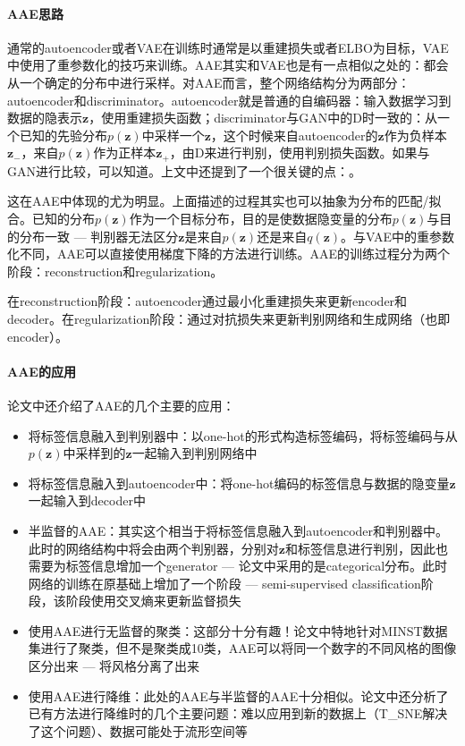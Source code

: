 \paragraph{AAE思路}
通常的autoencoder或者VAE\cite{kingma2014autoencoding}在训练时通常是以重建损失或者ELBO为目标，VAE中使用了重参数化的技巧来训练。AAE其实和VAE也是有一点相似之处的：都会从一个确定的分布中进行采样。对AAE而言，整个网络结构分为两部分：autoencoder和discriminator。autoencoder就是普通的自编码器：输入数据学习到数据的隐表示$\boldsymbol{z}$，使用重建损失函数；discriminator与GAN中的D时一致的：从一个已知的先验分布$p(\boldsymbol{z})$中采样一个$\boldsymbol{z}$，这个时候来自autoencoder的$\boldsymbol{z}$作为负样本$\boldsymbol{z}_-$，来自$p(\boldsymbol{z})$作为正样本$\boldsymbol{z}_+$，由D来进行判别，使用判别损失函数。如果与GAN进行比较，可以知道。上文中还提到了一个很关键的点：。

这在AAE中体现的尤为明显。上面描述的过程其实也可以抽象为分布的匹配/拟合。已知的分布$p(\boldsymbol{z})$作为一个目标分布，目的是使数据隐变量的分布$p(\boldsymbol{z})$与目的分布一致 --- 判别器无法区分$\boldsymbol{z}$是来自$p(\boldsymbol{z})$还是来自$q(\boldsymbol{z})$。与VAE中的重参数化不同，AAE可以直接使用梯度下降的方法进行训练。AAE的训练过程分为两个阶段：reconstruction和regularization。

在reconstruction阶段：autoencoder通过最小化重建损失来更新encoder和decoder。在regularization阶段：通过对抗损失来更新判别网络和生成网络（也即encoder）。



\paragraph{AAE的应用}
论文中还介绍了AAE的几个主要的应用：
\begin{itemize}
	\item 将标签信息融入到判别器中：以one-hot的形式构造标签编码，将标签编码与从$p(\boldsymbol{z})$中采样到的$\boldsymbol{z}$一起输入到判别网络中
	\item 将标签信息融入到autoencoder中：将one-hot编码的标签信息与数据的隐变量$\boldsymbol{z}$一起输入到decoder中
	\item 半监督的AAE：其实这个相当于将标签信息融入到autoencoder和判别器中。此时的网络结构中将会由两个判别器，分别对$\boldsymbol{z}$和标签信息进行判别，因此也需要为标签信息增加一个generator --- 论文中采用的是categorical分布。此时网络的训练在原基础上增加了一个阶段 --- semi-supervised classification阶段，该阶段使用交叉熵来更新监督损失
	\item 使用AAE进行无监督的聚类：这部分十分有趣！论文中特地针对MINST数据集进行了聚类，但不是聚类成10类，AAE可以将同一个数字的不同风格的图像区分出来 --- 将风格分离了出来
	\item 使用AAE进行降维：此处的AAE与半监督的AAE十分相似。论文中还分析了已有方法进行降维时的几个主要问题：难以应用到新的数据上（T\_SNE解决了这个问题）、数据可能处于流形空间等
\end{itemize}

